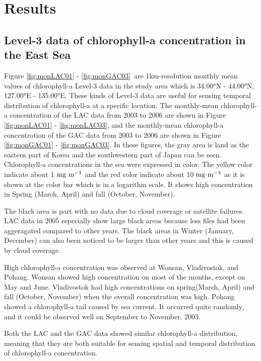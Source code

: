\section{Results}

\subsection{Level-3 data of chlorophyll-a concentration in the East Sea}

Figure \ref{fig:monLAC01} - \ref{fig:monGAC03}\ are 1km-resolution monthly mean values of chlorophyll-a Level-3 data in the study area which is 34.00°N - 44.00°N, 127.00°E - 135.00°E. These kinds of Level-3 data are useful for sensing temporal distribution of chlorophyll-a at a specific location. The monthly-mean chlorophyll-a concentration of the LAC data from 2003 to 2006 are shown in Figure \ref{fig:monLAC01} - \ref{fig:monLAC03}, and the monthly-mean chlorophyll-a concentration of the GAC data from 2003 to 2006 are shown in Figure \ref{fig:monGAC01} - \ref{fig:monGAC03}.
In these figures, the gray area is land as the eastern part of Korea and the southwestern part of Japan can be seen. Chlorophyll-a concentrations in the sea were expressed in color. The yellow color indicate about 1 $\rm mg~m^{-3}$ and the red color indicate about 10 $\rm mg~m^{-3}$ as it is shown at the color bar which is in a logarithm scale. It shows high concentration in Spring (March, April) and fall (October, November).

The black area is part with no data due to cloud coverage or satellite failures. LAC data in 2005 especially show large black areas because less files had been aggeragated compared to other years. The black areas in Winter (January, December) can also been noticed to be larger than other years and this is caused by cloud coverage.

High chlorophyll-a concentration was observed at Wonsan, Vladivostok, and Pohang. Wonsan showed high concentration on most of the months, except on May and June. Vladivostok had high concentrations on spring(March, April) and fall (October, November) when the overall concentration was high. Pohang showed a chlorophyll-a tail caused by sea current. It occurred quite randomly, and it could be observed well on September to November, 2003. 

Both the LAC and the GAC data showed similar chlorophyll-a distribution, meaning that they are both suitable for sensing spatial and temporal distribution of chlorophyll-a concentration.

